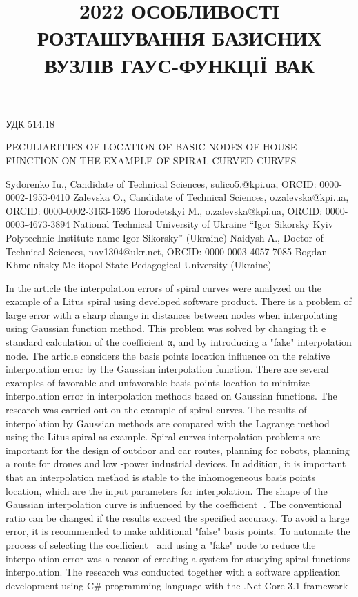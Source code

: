 \documentclass[12pt,a4paper]{article}
\begin{document}
\title{2022 ОСОБЛИВОСТІ РОЗТАШУВАННЯ БАЗИСНИХ ВУЗЛІВ ГАУС-ФУНКЦІЇ ВАК}
 УДК 514.18
\par
PECULIARITIES OF LOCATION OF BASIC NODES OF HOUSE- FUNCTION ON THE EXAMPLE OF SPIRAL-CURVED CURVES
\par
Sydorenko Iu., Candidate of Technical Sciences, sulico5.@kpi.ua, ORCID: 0000-0002-1953-0410 Zalevska O., Candidate of Technical Sciences, o.zalevska@kpi.ua, ORCID: 0000-0002-3163-1695 Horodetskyi M., o.zalevska@kpi.ua, ORCID: 0000-0003-4673-3894 National Technical University of Ukraine “Igor Sikorsky Kyiv Polytechnic Institute name Igor Sikorsky” (Ukraine) Naidysh А., Doctor of Technical Sciences, nav1304@ukr.net, ORCID: 0000-0003-4057-7085 Bogdan Khmelnitsky Melitopol State Pedagogical University (Ukraine)
\par
In the article the interpolation errors of spiral curves were analyzed on the example of a Litus spiral using developed software product. There is a problem of large error with a sharp change in distances between nodes when interpolating using Gaussian function method. This problem was solved by changing th e standard calculation of the coefficient α, and by introducing a "fake" interpolation node. The article considers the basis points location influence on the relative interpolation error by the Gaussian interpolation function. There are several examples of favorable and unfavorable basis points location to minimize interpolation error in interpolation methods based on Gaussian functions. The research was carried out on the example of spiral curves. The results of interpolation by Gaussian methods are compared with the Lagrange method using the Litus spiral as example. Spiral curves interpolation problems are important for the design of outdoor and car routes, planning for robots, planning a route for drones and low -power industrial devices. In addition, it is important that an interpolation method is stable to the inhomogeneous basis points location, which are the input parameters for interpolation. The shape of the Gaussian interpolation curve is influenced by the coefficient . The conventional ratio can be changed if the results exceed the specified accuracy. To avoid a large error, it is recommended to make additional "false" basis points. To automate the process of selecting the coefficient  and using a "fake" node to reduce the interpolation error was a reason of creating a system for studying spiral functions interpolation. The research was conducted together with a software application development using C\# programming language with the .Net Core 3.1 framework
\end{document}
